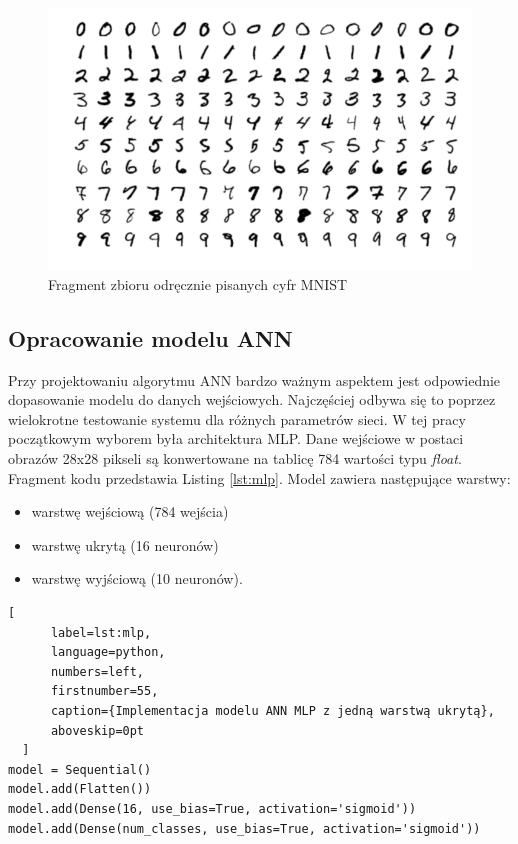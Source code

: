 \begin{figure}[!h]
  \centering
  \includegraphics[width=\textwidth]{img/mnist.png}
  \caption{Fragment zbioru odręcznie pisanych cyfr MNIST}
  \label{mnist-set}
\end{figure}

\subsection{Opracowanie modelu ANN}

Przy projektowaniu algorytmu ANN bardzo ważnym aspektem jest odpowiednie dopasowanie modelu do danych wejściowych. 
Najczęściej odbywa się to poprzez wielokrotne testowanie systemu dla różnych parametrów sieci. W tej pracy początkowym 
wyborem była architektura MLP. Dane wejściowe w postaci obrazów 28x28 pikseli są konwertowane na tablicę 784 wartości 
typu \emph{float}. Fragment kodu przedstawia Listing \ref{lst:mlp}. Model zawiera następujące warstwy:
\begin{itemize}
  \item warstwę wejściową (784 wejścia)
  \item warstwę ukrytą (16 neuronów)
  \item warstwę wyjściową (10 neuronów).
\end{itemize}

\begin{addmargin}[10mm]{0mm}
  \begin{lstlisting}[
      label=lst:mlp,
      language=python,
      numbers=left,
      firstnumber=55,
      caption={Implementacja modelu ANN MLP z jedną warstwą ukrytą},
      aboveskip=0pt
  ]
model = Sequential()
model.add(Flatten())
model.add(Dense(16, use_bias=True, activation='sigmoid'))
model.add(Dense(num_classes, use_bias=True, activation='sigmoid'))

  \end{lstlisting}
  \end{addmargin}

